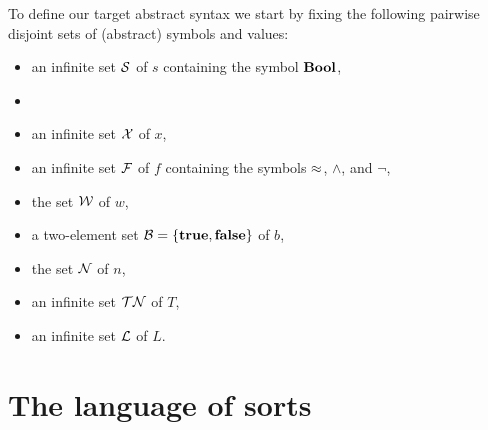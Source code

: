 To define our target abstract syntax we start by fixing the following pairwise disjoint
sets of (abstract) symbols and values:
\begin{itemize}
\item
an infinite set $\mathcal{S}$ of  $s$ 
containing the symbol $\textbf{Bool}$,

\item
{}

\item
an infinite set $\mathcal{X}$ of  $x$,

\item
an infinite set $\mathcal{F}$ of  $f$
containing the symbols $\approx$, $\land$, and $\lnot$,



%
\item
the set $\mathcal{W}$ of  $w$,

\item
a two-element set $\mathcal{B} = \{\textbf{true}, \textbf{false}\}$ of  $b$,

\item
the set $\mathcal{N}$ of  $n$,

\item
an infinite set $\mathcal{TN}$ of  $T$,

\item
an infinite set $\mathcal{L}$ of  $L$.


\end{itemize}


\section{The language of sorts}

